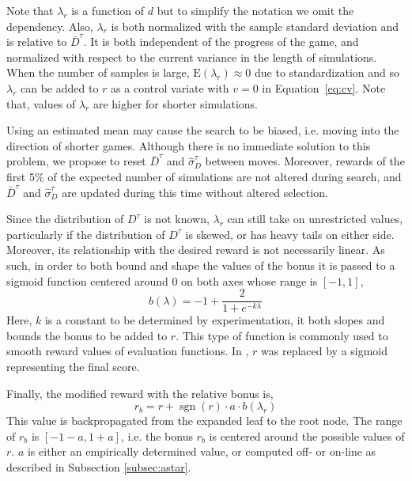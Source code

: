 \documentclass{ecai2014}
\newcommand{\sgn}{\mathop{\mathrm{sgn}}}
\newcommand{\E}[1]{\mathrm{E}\left( #1 \right)}
\begin{document}
Note that $\lambda_r$ is a function of $d$ but to simplify the notation we omit the dependency. 
Also, $\lambda_r$ is both normalized with the sample standard deviation and is relative to $\bar{D}^\tau$. It is both independent of the progress of the game, and normalized with respect to the current variance in the length of simulations. When the number of samples is large, $\E{\lambda_r} \approx 0$ due to standardization and so $\lambda_r$ can be added to $r$ as a control variate with $v = 0$ in Equation~\ref{eq:cv}. Note that, values of $\lambda_r$ are higher for shorter simulations.

Using an estimated mean may cause the search to be biased, i.e. moving into the direction of shorter games. Although there is no immediate solution to this problem, we propose to reset $\bar{D}^\tau$ and $\hat{\sigma}^\tau_D$ between moves. Moreover, rewards of the first $5\%$ of the expected number of simulations are not altered during search, and $\bar{D}^\tau$ and $\hat{\sigma}^\tau_D$ are updated during this time without altered selection.

Since the distribution of $D^\tau$ is not known, $\lambda_r$ can still take on unrestricted values, particularly if the distribution of $D^\tau$ is skewed, or has heavy tails on either side. Moreover, its relationship with the desired reward is not necessarily linear. As such, in order to both bound and shape the values of the bonus it is passed to a sigmoid function centered around $0$ on both axes whose range is $[-1,1]$,
\begin{equation}
b(\lambda)=-1+\frac{2}{1+e^{-k\lambda}}
\label{eq:sigmoid}
\end{equation}
Here, $k$ is a constant to be determined by experimentation, it both slopes and bounds the bonus to be added to $r$. This type of function is commonly used to smooth reward values of evaluation functions. In \cite{shibahara2008combining}, $r$ was replaced by a sigmoid representing the final score.

Finally, the modified reward with the relative bonus is, 
\begin{equation}
r_b=r+\sgn(r) \cdot a \cdot b(\lambda_r)
\label{eq:rb}
\end{equation}
This value is backpropagated from the expanded leaf to the root node. The range of $r_b$ is $[-1-a, 1+a]$, i.e. the bonus $r_b$ is centered around the possible values of $r$. $a$ is either an empirically determined value, or computed off- or on-line as described in Subsection \ref{subsec:astar}.
\end{document}
